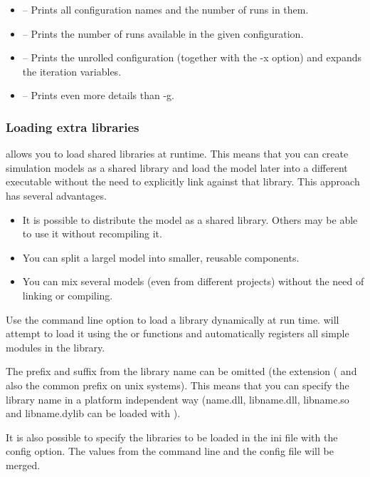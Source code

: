 \begin{itemize}
  \item {} -- Prints all configuration names and the number of runs in them.
  \item {} -- Prints the number of runs available in the given configuration.
  \item {} -- Prints the unrolled configuration (together with the -x option) and
                    expands the iteration variables.
  \item {} -- Prints even more details than -g.
\end{itemize}


\subsubsection{Loading extra libraries}

{\opp} allows you to load shared libraries at runtime. This means that you can create
simulation models as a shared library and load the model later into a different executable without
the need to explicitly link against that library. This approach has several advantages.

\begin{itemize}
  \item It is possible to distribute the model as a shared library. Others may be able to use
  it without recompiling it.
  \item You can split a largel model into smaller, reusable components.
  \item You can mix several models (even from different projects)
    without the need of linking or compiling.
\end{itemize}

Use the  command line option to load a library dynamically at run time.
{\opp} will attempt to load it using the  or  functions and
automatically registers all simple modules in the library.

The prefix and suffix from the library name can be omitted (the extension ( and also
the common  prefix on unix systems). This means that you can specify the library name in a
platform independent way (name.dll, libname.dll, libname.so and libname.dylib can be loaded with ).

It is also possible to specify the libraries to be loaded in the ini file with the  config option.
The values from the command line and the config file will be merged.

